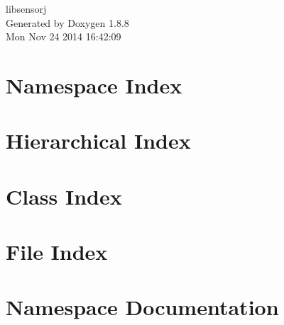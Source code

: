 \documentclass[twoside]{book}
\newcommand{\+}{\discretionary{\mbox{\scriptsize$\hookleftarrow$}}{}{}}
\newcommand{\clearemptydoublepage}{%
  \newpage{\pagestyle{empty}\cleardoublepage}%
}
\begin{document}
\hypersetup{pageanchor=false,
             bookmarks=true,
             bookmarksnumbered=true,
             pdfencoding=unicode
            }
\begin{titlepage}
\vspace*{7cm}
\begin{center}%
{\Large libsensorj }\\
\vspace*{1cm}
{\large Generated by Doxygen 1.8.8}\\
\vspace*{0.5cm}
{\small Mon Nov 24 2014 16:42:09}\\
\end{center}
\end{titlepage}
\clearemptydoublepage
\tableofcontents
\clearemptydoublepage
{}
\hypersetup{pageanchor=true}

\chapter{Namespace Index}

\chapter{Hierarchical Index}

\chapter{Class Index}

\chapter{File Index}

\chapter{Namespace Documentation}















\end{document}
